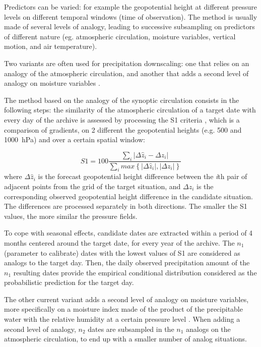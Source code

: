 \documentclass{ametsoc}
\begin{document}
Predictors can be varied: for example the geopotential height at different pressure levels on different temporal windows (time of observation). The method is usually made of several levels of analogy, leading to successive subsampling on predictors of different nature (eg. atmospheric circulation, moisture variables, vertical motion, and air temperature).

Two variants are often used for precipitation downscaling: one that relies on an analogy of the atmospheric circulation, and another that adds a second level of analogy on moisture variables \citep{Obled2002, Bontron2005, Marty2012}.

The method based on the analogy of the synoptic circulation consists in the following steps: the similarity of the atmospheric circulation of a target date with every day of the archive is assessed by processing the S1 criteria \citep{Teweles1954, Drosdowsky2003}, which is a comparison of gradients, on 2 different the geopotential heights (e.g. 500 and 1000~hPa) and over a certain spatial window:

\begin{equation}
\label{eq:S1}
S1=100 \frac {\displaystyle \sum_{i} \vert \Delta\hat{z}_{i} - \Delta z_{i} \vert}
{\displaystyle \sum_{i} max\left\lbrace \vert \Delta\hat{z}_{i} \vert , \vert \Delta z_{i} \vert \right\rbrace }
\end{equation}
where $\Delta \hat{z}_{i}$ is the forecast geopotential height difference between the \textit{i}th pair of adjacent points from the grid of the target situation, and $\Delta z_{i}$ is the corresponding observed geopotential height difference in the candidate situation. The differences are processed separately in both directions. The smaller the S1 values, the more similar the pressure fields.



To cope with seasonal effects, candidate dates are extracted within a period of 4 months centered around the target date, for every year of the archive. The $n_{1}$ (parameter to calibrate) dates with the lowest values of S1 are considered as analogs to the target day. Then, the daily observed precipitation amount of the $n_{1}$ resulting dates provide the empirical conditional distribution considered as the probabilistic prediction for the target day.

The other current variant adds a second level of analogy on moisture variables, more specifically on a moisture index made of the product of the precipitable water with the relative humidity at a certain pressure level \citep[e.g. 850~hPa, see][]{Bontron2004}. When adding a second level of analogy, $n_{2}$ dates are subsampled in the $n_{1}$ analogs on the atmospheric circulation, to end up with a smaller number of analog situations.
\end{document}
